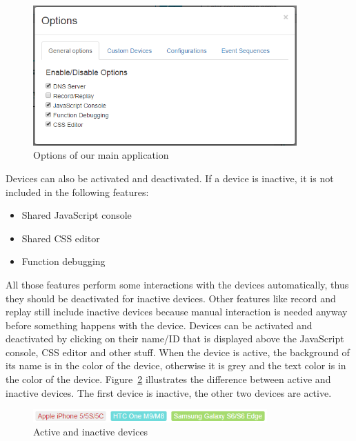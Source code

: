 \begin{figure}[H]
  \centering
    \includegraphics[width=0.9\textwidth]{images/screenshots/options.png}
	\caption[Screenshot: Options]{Options of our main application}
	\label{fig:options}
\end{figure}

Devices can also be activated and deactivated. If a device is inactive, it is not included in the following features:
\begin{itemize}
	\item Shared JavaScript console
	\item Shared CSS editor
	\item Function debugging
\end{itemize}
All those features perform some interactions with the devices automatically, thus they should be deactivated for inactive devices. Other features like record and replay still include inactive devices because manual interaction is needed anyway before something happens with the device. Devices can be activated and deactivated by clicking on their name/ID that is displayed above the JavaScript console, CSS editor and other stuff. When the device is active, the background of its name is in the color of the device, otherwise it is grey and the text color is in the color of the device. Figure~\ref{fig:active_inactive} illustrates the difference between active and inactive devices. The first device is inactive, the other two devices are active.

\begin{figure}[H]
  \centering
    \includegraphics[width=0.8\textwidth]{images/screenshots/active_inactive.png}
	\caption[Screenshot: Active/inactive devices]{Active and inactive devices}
	\label{fig:active_inactive}
\end{figure}

